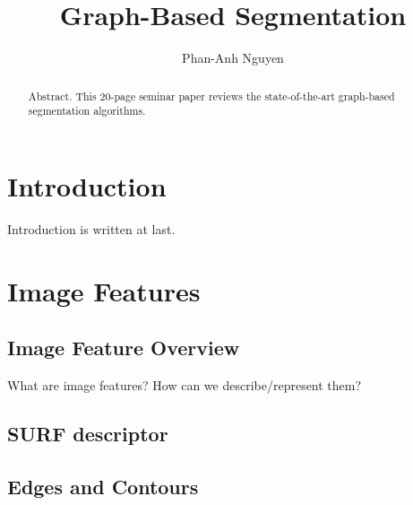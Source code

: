 \documentclass{SMBV12}
\begin{document}
\title{Graph-Based Segmentation}

\author{Phan-Anh Nguyen}

\maketitle


\begin{abstract}%
Abstract. This 20-page seminar paper reviews the state-of-the-art graph-based segmentation algorithms.
\end{abstract}



%
\section{Introduction}

Introduction is written at last.

%
\section{Image Features}

\subsection{Image Feature Overview}

What are image features? How can we describe/represent them?

\subsection{SURF descriptor}

\cite{bay2006surf}

\subsection{Edges and Contours}
\end{document}
